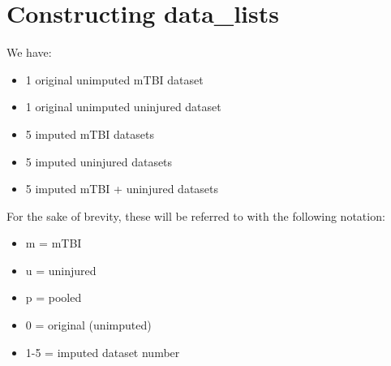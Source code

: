 \documentclass[
  letterpaper,
  DIV=11,
  numbers=noendperiod]{scrreprt}
\providecommand{\tightlist}{%
  \setlength{\itemsep}{0pt}\setlength{\parskip}{0pt}}\usepackage{longtable,booktabs,array}
\begin{document}
\section{Constructing data\_lists}\label{constructing-data_lists}

We have:

\begin{itemize}
\tightlist
\item
  1 original unimputed mTBI dataset
\item
  1 original unimputed uninjured dataset
\item
  5 imputed mTBI datasets
\item
  5 imputed uninjured datasets
\item
  5 imputed mTBI + uninjured datasets
\end{itemize}

For the sake of brevity, these will be referred to with the following
notation:

\begin{itemize}
\tightlist
\item
  m = mTBI
\item
  u = uninjured
\item
  p = pooled
\item
  0 = original (unimputed)
\item
  1-5 = imputed dataset number
\end{itemize}
\end{document}
